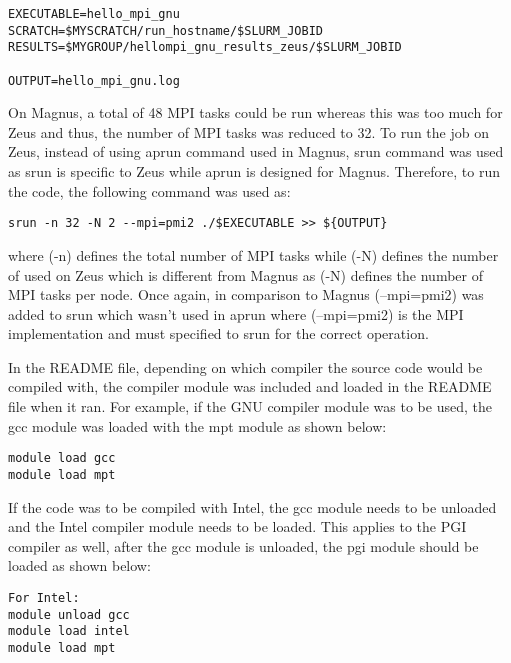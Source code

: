 \begin{tcolorbox}
\begin{Verbatim}[fontsize=\scriptsize]
EXECUTABLE=hello_mpi_gnu
SCRATCH=$MYSCRATCH/run_hostname/$SLURM_JOBID
RESULTS=$MYGROUP/hellompi_gnu_results_zeus/$SLURM_JOBID

OUTPUT=hello_mpi_gnu.log
\end{Verbatim}
\end{tcolorbox}

On Magnus, a total of 48 MPI tasks could be run whereas this was too much for Zeus and thus, the number of MPI tasks was reduced to 32. To run the job
on Zeus, instead of using aprun command used in Magnus, srun command was used as srun is specific to Zeus while aprun is designed for Magnus. Therefore,
to run the code, the following command was used as:

\begin{tcolorbox}
\begin{Verbatim}[fontsize=\scriptsize]
srun -n 32 -N 2 --mpi=pmi2 ./$EXECUTABLE >> ${OUTPUT}
\end{Verbatim}
\end{tcolorbox}

where (-n) defines the total number of MPI tasks while (-N) defines the number of used on Zeus which is different from Magnus as (-N) defines the number
of MPI tasks per node. Once again, in comparison to Magnus (--mpi=pmi2) was added to srun which wasn't used in aprun where (--mpi=pmi2) is the MPI
implementation and must specified to srun for the correct operation.

In the README file, depending on which compiler the source code would be compiled with, the compiler module was included and loaded in the README file 
when it ran. For example, if the GNU compiler module was to be used, the gcc module was loaded with the mpt module as shown below:

\begin{tcolorbox}
\begin{Verbatim}[fontsize=\scriptsize]
module load gcc
module load mpt
\end{Verbatim}
\end{tcolorbox}

If the code was to be compiled with Intel, the gcc module needs to be unloaded and the Intel compiler module needs to be loaded. This applies to the PGI
compiler as well, after the gcc module is unloaded, the pgi module should be loaded as shown below:

\begin{tcolorbox}
\begin{Verbatim}[fontsize=\scriptsize]
For Intel:
module unload gcc
module load intel
module load mpt
\end{Verbatim}
\end{tcolorbox}

